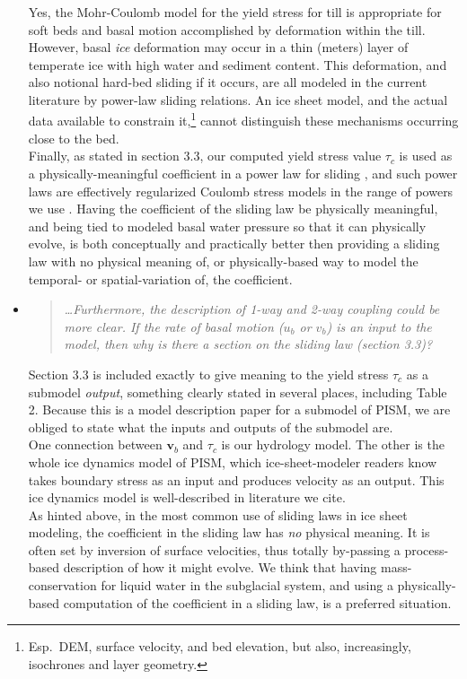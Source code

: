 \documentclass[11pt,reqno]{amsart}
\newcommand{\reply}[2]{
\medskip\medskip
\item  \begin{quote}
\emph{#1}
\end{quote}

\medskip
\noindent #2}
\begin{document}
\begin{itemize}
{\indent Yes, the Mohr-Coulomb model for the yield stress for till is appropriate for soft beds and basal motion accomplished by deformation within the till.  However, basal \emph{ice} deformation may occur in a thin (meters) layer of temperate ice with high water and sediment content. This deformation, and also notional hard-bed sliding if it occurs, are all modeled in the current literature by power-law sliding relations.  An ice sheet model, and the actual data available to constrain it,\footnote{Esp.~DEM, surface velocity, and bed elevation, but also, increasingly, isochrones and layer geometry.} cannot distinguish these mechanisms occurring close to the bed. \\
\indent Finally, as stated in section 3.3, our computed yield stress value $\tau_c$ is used as a physically-meaningful coefficient in a power law for sliding \cite{AschwandenAdalgeirsdottirKhroulev}, and such power laws are effectively regularized Coulomb stress models in the range of powers we use \cite{SchoofCoulombBlatter}.  Having the coefficient of the sliding law be physically meaningful, and being tied to modeled basal water pressure so that it can physically evolve, is both conceptually and practically better then providing a sliding law with no physical meaning of, or physically-based way to model the temporal- or spatial-variation of, the coefficient.}

\reply{\dots  Furthermore, the description of 1-way and 2-way coupling could be more clear. If the rate of basal motion ($u_b$ or $v_b$) is an input to the model, then why is there a section on the sliding law (section 3.3)?}
{Section 3.3 is included exactly to give meaning to the yield stress $\tau_c$ as a submodel \emph{output}, something clearly stated in several places, including Table 2.  Because this is a model description paper for a submodel of PISM, we are obliged to state what the inputs and outputs of the submodel are.\\
\indent One connection between $\mathbf{v}_b$ and $\tau_c$ is our hydrology model.  The other is the whole ice dynamics model of PISM, which ice-sheet-modeler readers know takes boundary stress as an input and produces velocity as an output.  This ice dynamics model is well-described in literature we cite. \\
\indent As hinted above, in the most common use of sliding laws in ice sheet modeling, the coefficient in the sliding law has \emph{no} physical meaning.  It is often set by inversion of surface velocities, thus totally by-passing a process-based description of how it might evolve.  We think that having mass-conservation for liquid water in the subglacial system, and using a physically-based computation of the coefficient in a sliding law, is a preferred situation.}


\end{itemize}
\end{document}
